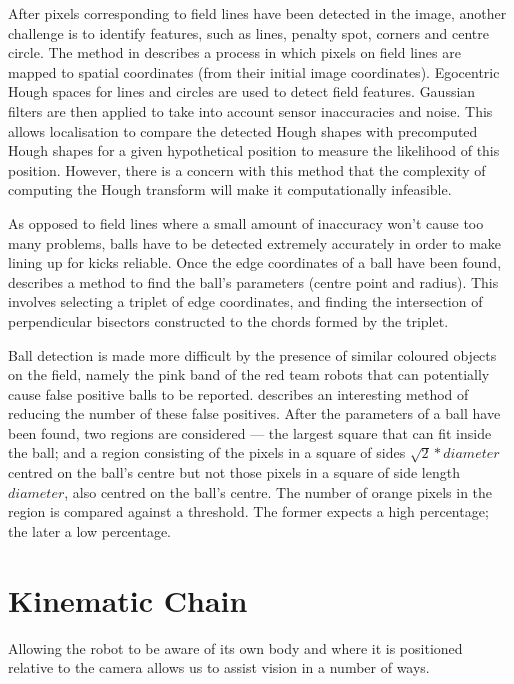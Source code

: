 \documentclass[pdftex,11pt,a4paper]{report}
\begin{document}
After pixels corresponding to field lines have been detected in the image,
another challenge is to identify features, such as lines, penalty spot,
corners and centre circle. The method in \cite{utz2003improving} describes
a process in which pixels on field lines are mapped to spatial coordinates
(from their initial image coordinates). Egocentric Hough spaces for lines
and circles are used to detect field features. Gaussian filters are then
applied to take into account sensor inaccuracies and noise. This allows
localisation to compare the detected Hough shapes with precomputed Hough
shapes for a given hypothetical position to measure the likelihood of this position. However, there is a concern with this method that the complexity of computing the Hough transform will make it computationally infeasible.   

As opposed to field lines where a small amount of inaccuracy won't cause too many problems, balls have to be detected extremely accurately in order to make lining up for kicks reliable. Once the edge coordinates of a ball have been found, \cite{north2005object} describes a method to find the ball's parameters (centre point and radius). This involves selecting a triplet of edge coordinates, and finding the intersection of perpendicular bisectors constructed to the chords formed by the triplet.

Ball detection is made more difficult by the presence of similar coloured
objects on the field, namely the pink band of the red team robots that can
potentially cause false positive balls to be reported. \cite{thomas09code}
describes an interesting method of reducing the number of these false
positives. After the parameters of a ball have been found, two regions are considered --- the largest square that can fit inside the ball; and a region consisting of the pixels in a square of sides \begin{math}\sqrt{2}*diameter\end{math} centred on the ball's centre but not those pixels in a square of side length \begin{math}diameter\end{math}, also centred on the ball's centre. The number of orange pixels in the region is compared against a threshold. The former expects a high percentage; the later a low percentage.

\section{Kinematic Chain}
Allowing the robot to be aware of its own body and where it is positioned relative to the camera allows us to assist vision in a number of ways. 
\end{document}
